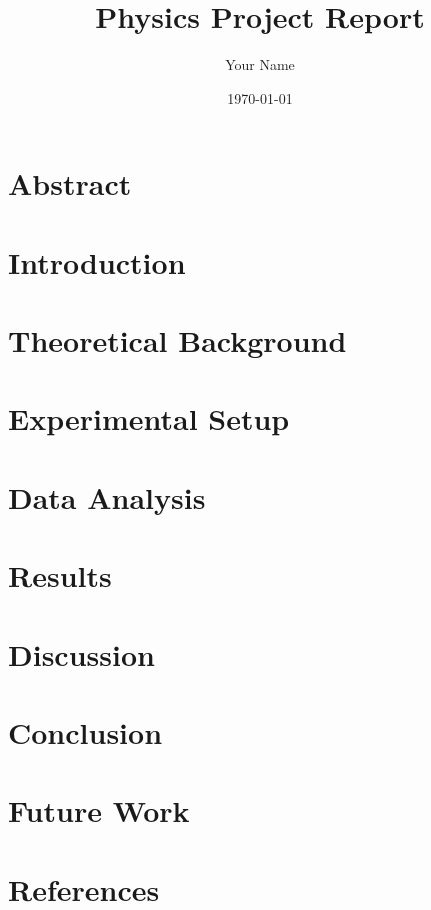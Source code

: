 \documentclass[a4paper,12pt]{article}
\title{Physics Project Report}
\author{Your Name}
\date{\today}
\begin{document}
\maketitle

\section{Abstract}

\section{Introduction}

\section{Theoretical Background}

\section{Experimental Setup}

\section{Data Analysis}

\section{Results}

\section{Discussion}

\section{Conclusion}

\section{Future Work}

\section{References}
\end{document}
